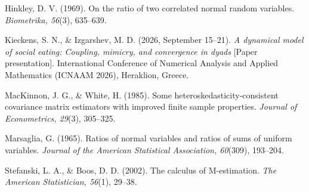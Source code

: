 \documentclass[12pt]{article}
\theoremstyle{definition}
\begin{document}
Hinkley, D. V. (1969). On the ratio of two correlated normal random variables. \emph{Biometrika, 56}(3), 635--639.

Kieckens, S. N., \& Izgarshev, M. D. (2026, September 15--21). \emph{A dynamical model of social eating: Coupling, mimicry, and convergence in dyads} [Paper presentation]. International Conference of Numerical Analysis and Applied Mathematics (ICNAAM 2026), Heraklion, Greece.

MacKinnon, J. G., \& White, H. (1985). Some heteroskedasticity-consistent covariance matrix estimators with improved finite sample properties. \emph{Journal of Econometrics, 29}(3), 305--325.

Marsaglia, G. (1965). Ratios of normal variables and ratios of sums of uniform variables. \emph{Journal of the American Statistical Association, 60}(309), 193--204.

Stefanski, L. A., \& Boos, D. D. (2002). The calculus of M-estimation. \emph{The American Statistician, 56}(1), 29--38.

\endgroup
\end{document}
